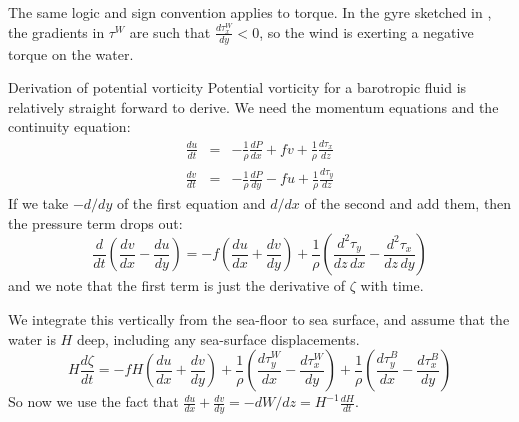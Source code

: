 The same logic and sign convention applies to torque.  In the gyre sketched in , the gradients in $\tau^W$ are such that $\frac{d\tau_x^W}{dy} < 0$, so the wind is exerting a negative torque on the water.  


\begin{derivbox}[label={box:potentialvort}]{Derivation of potential vorticity}
Potential vorticity for a barotropic fluid is relatively straight forward to derive.  We  need the momentum equations and the continuity equation:
\begin{eqnarray*}
    \frac{du}{dt} & = & -\frac{1}{\rho}\frac{dP}{dx} + fv + \frac{1}{\rho}\frac{d\tau_x}{dz}\\
    \frac{dv}{dt} & = & -\frac{1}{\rho}\frac{dP}{dy} - fu + \frac{1}{\rho}\frac{d\tau_y}{dz}
\end{eqnarray*}
If we take $-d/dy$ of the first equation and $d/dx$ of the second and add them, then the pressure term drops out:
\begin{equation}
    \frac{d}{dt} \left( \frac{dv}{dx} - \frac{du}{dy}\right) = -f \left(\frac{du}{dx} + \frac{dv}{dy} \right) + \frac{1}{\rho}\left(\frac{d^2\tau_y}{dz\,dx} - \frac{d^2\tau_x}{dz\,dy}\right)
\end{equation}
and we note that the first term is just the derivative of $\zeta$ with time.  

We integrate this vertically from the sea-floor to sea surface, and assume that the water is $H$ deep, including any sea-surface displacements.   
\begin{equation}
    H\frac{d\zeta}{dt}  = -f H \left(\frac{du}{dx} + \frac{dv}{dy} \right) + \frac{1}{\rho}\left(\frac{d\tau_y^W}{dx} - \frac{d\tau_x^W}{dy}\right) + \frac{1}{\rho}\left(\frac{d\tau_y^B}{dx} - \frac{d\tau_x^B}{dy}\right) 
\end{equation}
So now we use the fact that $\frac{du}{dx} + \frac{dv}{dy} = -dW/dz = H^{-1}\frac{dH}{dt}$.  


\end{derivbox}



